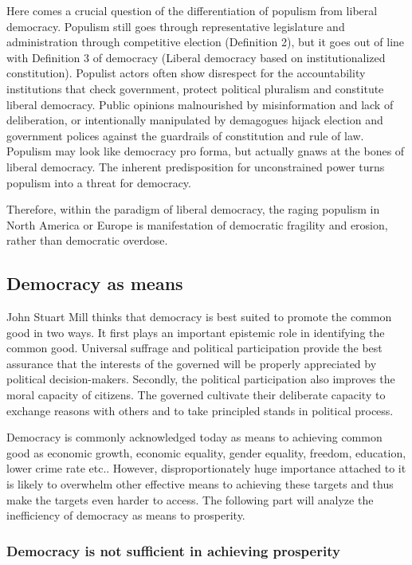 \documentclass{scrartcl}
\begin{document}
Here comes a crucial question of the differentiation of populism from
liberal democracy. Populism still goes through representative legislature
and administration through competitive election (Definition 2), but
it goes out of line with Definition 3 of democracy (Liberal democracy
based on institutionalized constitution). Populist actors often show
disrespect for the accountability institutions that check government,
protect political pluralism and constitute liberal democracy. Public
opinions malnourished by misinformation and lack of deliberation,
or intentionally manipulated by demagogues hijack election and government
polices against the guardrails of constitution and rule of law. Populism
may look like democracy pro forma, but actually gnaws at the bones
of liberal democracy. The inherent predisposition for unconstrained
power turns populism into a threat for democracy.

Therefore, within the paradigm of liberal democracy, the raging populism
in North America or Europe is manifestation of democratic fragility
and erosion, rather than democratic overdose. 

\subsection*{Democracy as means}

John Stuart Mill thinks that democracy is best suited to promote the
common good in two ways. It first plays an important epistemic role
in identifying the common good. Universal suffrage and political participation
provide the best assurance that the interests of the governed will
be properly appreciated by political decision-makers. Secondly, the
political participation also improves the moral capacity of citizens.
The governed cultivate their deliberate capacity to exchange reasons
with others and to take principled stands in political process.\autocite{Mill_2010} 

Democracy is commonly acknowledged today as means to achieving common
good as economic growth, economic equality, gender equality, freedom,
education, lower crime rate etc.. However, disproportionately huge
importance attached to it is likely to overwhelm other effective means
to achieving these targets and thus make the targets even harder to
access. The following part will analyze the inefficiency of democracy
as means to prosperity. 

\subsubsection*{Democracy is not sufficient in achieving prosperity}
\end{document}
